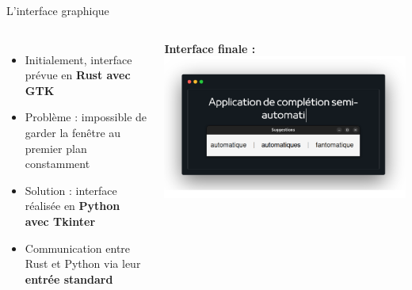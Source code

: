\begin{frame}{L'interface graphique}
	\begin{columns}
		\begin{itemize}
			\item Initialement, interface prévue en \textbf{Rust avec GTK}
			\item Problème : impossible de garder la fenêtre au premier plan constamment
			\item Solution : interface réalisée en \textbf{Python avec Tkinter}
			\item Communication entre Rust et Python via leur \textbf{entrée standard}
		\end{itemize}

		\centering
		\textbf{Interface finale :} \\
		\includegraphics[width=\textwidth]{images/illustration.png}
	\end{columns}
\end{frame}


